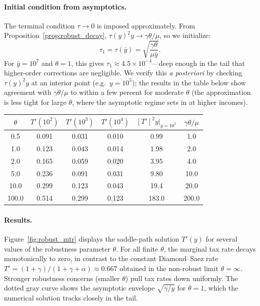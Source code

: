 \documentclass[12pt,a4paper]{article}
\theoremstyle{definition}
\theoremstyle{plain}
\theoremstyle{remark}
\begin{document}
\paragraph{Initial condition from asymptotics.}
The terminal condition $\tau \to 0$ is imposed approximately. From Proposition~\ref{prop:robust_decay}, $\tau(y)^2 y \to \gamma\theta/\mu$, so we initialize:
\[
  \tau_1 = \tau(\bar{y}) = \sqrt{\frac{\gamma\theta}{\mu\bar{y}}}.
\]
For $\bar{y} = 10^7$ and $\theta = 1$, this gives $\tau_1 \approx 4.5 \times 10^{-4}$---deep enough in the tail that higher-order corrections are negligible. We verify this \emph{a posteriori} by checking $\tau(y)^2 y$ at an interior point (e.g.\ $y = 10^5$); the results in the table below show agreement with $\gamma\theta/\mu$ to within a few percent for moderate $\theta$ (the approximation is less tight for large $\theta$, where the asymptotic regime sets in at higher incomes).

\medskip
\begin{center}
\begin{tabular}{c|ccc|cc}
\hline
$\theta$ & $T'(10^2)$ & $T'(10^3)$ & $T'(10^4)$ & $[T']^2 y\big|_{y=10^5}$ & $\gamma\theta/\mu$ \\
\hline
0.5  & 0.091 & 0.031 & 0.010 & 0.99 & 1.0 \\
1.0  & 0.123 & 0.043 & 0.014 & 1.98 & 2.0 \\
2.0  & 0.165 & 0.059 & 0.020 & 3.95 & 4.0 \\
5.0  & 0.236 & 0.091 & 0.031 & 9.80 & 10.0 \\
10.0 & 0.299 & 0.123 & 0.043 & 19.4 & 20.0 \\
100.0 & 0.514 & 0.299 & 0.123 & 183.0 & 200.0 \\
\hline
\end{tabular}
\end{center}

\paragraph{Results.}
Figure~\ref{fig:robust_mtr} displays the saddle-path solution $T'(y)$ for several values of the robustness parameter $\theta$. For all finite $\theta$, the marginal tax rate decays monotonically to zero, in contrast to the constant Diamond--Saez rate $T' = (1+\gamma)/(1+\gamma+\alpha) \approx 0.667$ obtained in the non-robust limit $\theta = \infty$. Stronger robustness concerns (smaller $\theta$) pull tax rates down uniformly. The dotted gray curve shows the asymptotic envelope $\sqrt{\gamma/y}$ for $\theta = 1$, which the numerical solution tracks closely in the tail.
\end{document}
